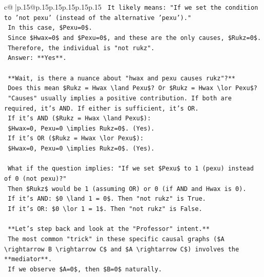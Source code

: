 \documentclass{article}
\begin{document}
{\begin{supertabular}{c@{$\;$}|p{.15\linewidth}@{}p{.15\linewidth}p{.15\linewidth}p{.15\linewidth}p{.15\linewidth}p{.15\linewidth}}
{{{\texttt{        It likely means: "If we set the condition to 'not pexu' (instead of the alternative 'pexu')."} \\
\texttt{        In this case, \$Pexu=0\$.} \\
\texttt{        Since \$Hwax=0\$ and \$Pexu=0\$, and these are the only causes, \$Rukz=0\$.} \\
\texttt{        Therefore, the individual is "not rukz".} \\
\texttt{        Answer: **Yes**.} \\
\\ 
\texttt{        **Wait, is there a nuance about "hwax and pexu causes rukz"?**} \\
\texttt{        Does this mean \$Rukz = Hwax \textbackslash{}land Pexu\$? Or \$Rukz = Hwax \textbackslash{}lor Pexu\$?} \\
\texttt{        "Causes" usually implies a positive contribution. If both are required, it's AND. If either is sufficient, it's OR.} \\
\texttt{        If it's AND (\$Rukz = Hwax \textbackslash{}land Pexu\$):} \\
\texttt{        \$Hwax=0, Pexu=0 \textbackslash{}implies Rukz=0\$. (Yes).} \\
\texttt{        If it's OR (\$Rukz = Hwax \textbackslash{}lor Pexu\$):} \\
\texttt{        \$Hwax=0, Pexu=0 \textbackslash{}implies Rukz=0\$. (Yes).} \\
\\ 
\texttt{        What if the question implies: "If we set \$Pexu\$ to 1 (pexu) instead of 0 (not pexu)?"} \\
\texttt{        Then \$Rukz\$ would be 1 (assuming OR) or 0 (if AND and Hwax is 0).} \\
\texttt{        If it's AND: \$0 \textbackslash{}land 1 = 0\$. Then "not rukz" is True.} \\
\texttt{        If it's OR: \$0 \textbackslash{}lor 1 = 1\$. Then "not rukz" is False.} \\
\\ 
\texttt{        **Let's step back and look at the "Professor" intent.**} \\
\texttt{        The most common "trick" in these specific causal graphs (\$A \textbackslash{}rightarrow B \textbackslash{}rightarrow C\$ and \$A \textbackslash{}rightarrow C\$) involves the **mediator**.} \\
\texttt{        If we observe \$A=0\$, then \$B=0\$ naturally.} \\
}}}
\end{supertabular}}
\end{document}
